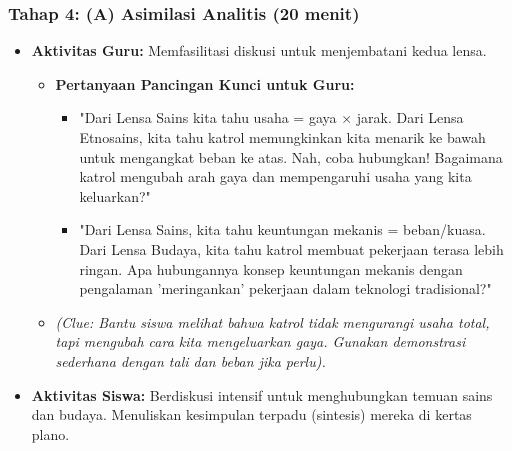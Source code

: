 \documentclass[a4paper,12pt]{article}
\begin{document}
\subsubsection{Tahap 4: (A) Asimilasi Analitis (20 menit)}
\begin{itemize}
\item \textbf{Aktivitas Guru:} Memfasilitasi diskusi untuk menjembatani kedua lensa.
    \begin{itemize}
    \item \textbf{Pertanyaan Pancingan Kunci untuk Guru:}
        \begin{itemize}
        \item "Dari Lensa Sains kita tahu usaha = gaya × jarak. Dari Lensa Etnosains, kita tahu katrol memungkinkan kita menarik ke bawah untuk mengangkat beban ke atas. Nah, coba hubungkan! Bagaimana katrol mengubah arah gaya dan mempengaruhi usaha yang kita keluarkan?"
        \item "Dari Lensa Sains, kita tahu keuntungan mekanis = beban/kuasa. Dari Lensa Budaya, kita tahu katrol membuat pekerjaan terasa lebih ringan. Apa hubungannya konsep keuntungan mekanis dengan pengalaman 'meringankan' pekerjaan dalam teknologi tradisional?"
        \end{itemize}
    \item \textit{(Clue: Bantu siswa melihat bahwa katrol tidak mengurangi usaha total, tapi mengubah cara kita mengeluarkan gaya. Gunakan demonstrasi sederhana dengan tali dan beban jika perlu).}
    \end{itemize}
\item \textbf{Aktivitas Siswa:} Berdiskusi intensif untuk menghubungkan temuan sains dan budaya. Menuliskan kesimpulan terpadu (sintesis) mereka di kertas plano.
\end{itemize}
\end{document}
